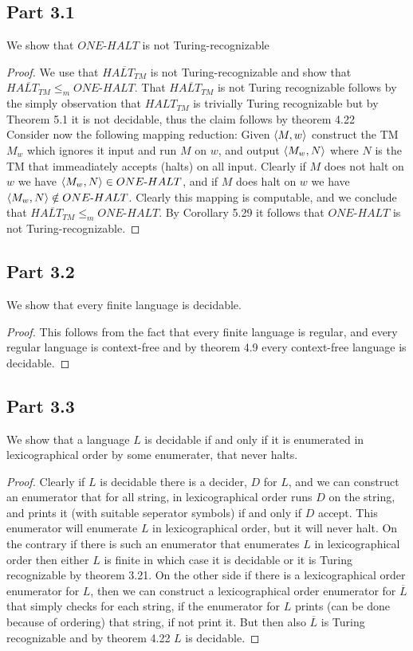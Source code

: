 \documentclass[a4paper,11pt]{article}
\newcommand{\tm}{\text{-}}
\numberwithin{equation}{section}
\begin{document}
	\subsection*{Part 3.1}
	We show that $ ONE\tm HALT $ is not Turing-recognizable\begin{proof}
		We use that $ \overline{HALT_{TM}} $ is not Turing-recognizable and show that $ \overline{HALT_{TM}}\leq_m ONE\tm HALT $.
		That $ \overline{HALT_{TM}} $ is not Turing recognizable follows by the simply observation that $ HALT_{TM} $ is trivially Turing recognizable but by Theorem 5.1 it is not decidable, thus the claim follows by theorem 4.22\\
		Consider now the following mapping reduction: Given $ \braket{M,w} $ construct the TM $ M_w $ which ignores it input and run $ M $ on $ w $, and output $ \braket{M_w,N} $ where $ N $ is the TM that immeadiately accepts (halts) on all input. Clearly if $ M $ does not halt on $ w $ we have $ \braket{M_w,N}\in ONE\tm HALT $, and if $ M $ does halt on $ w $ we have $ \braket{M_w,N}\notin ONE\tm HALT $. Clearly this mapping is computable, and we conclude that $ \overline{HALT_{TM}}\leq_m ONE\tm HALT $. By Corollary 5.29 it follows that $ ONE\tm HALT $ is not Turing-recognizable. 
	\end{proof}
	\subsection*{Part 3.2}
	We show that every finite language is decidable. \begin{proof}
		This follows from the fact that every finite language is regular, and every regular language is context-free and by theorem 4.9 every context-free language is decidable.
	\end{proof}
	\subsection*{Part 3.3}
	We show that a language $ L $ is decidable if and only if it is enumerated in lexicographical order by some enumerater, that never halts. \begin{proof}
		Clearly if $ L $ is decidable there is a decider, $ D $ for $ L $, and we can construct an enumerator that for all string, in lexicographical order runs $ D $ on the string, and prints it (with suitable seperator symbols) if and only if $ D $ accept. This enumerator will enumerate $ L $ in lexicographical order, but it will never halt. On the contrary if there is such an enumerator that enumerates $ L $ in lexicographical order then either $ L $ is finite in which case it is decidable or it is Turing recognizable by theorem 3.21. On the other side if there is a lexicographical order enumerator for $ L $, then we can construct a lexicographical order enumerator for $ \overline{L} $ that simply checks for each string, if the enumerator for $ L $ prints (can be done because of ordering) that string, if not print it. But then also $ \overline{L} $ is Turing recognizable and by theorem 4.22 $ L $ is decidable.
	\end{proof}
\end{document}
